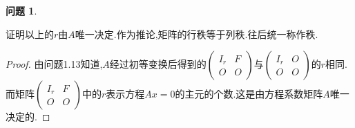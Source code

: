 \documentclass[11pt]{ctexart}
\theoremstyle{definition}
\newtheorem{qqq}{问题}[section]
\numberwithin{equation}{section}
\begin{document}
\begin{qqq}
    \begin{pinked}
        证明以上的$r$由$A$唯一决定.作为推论,矩阵的行秩等于列秩.往后统一称作秩.
    \end{pinked}  
\end{qqq}
\begin{proof}
    由问题1.13知道,$A$经过初等变换后得到的$\begin{pmatrix}
        I_r&F\\O&O
    \end{pmatrix}$与$\begin{pmatrix}
        I_r & O\\O & O
    \end{pmatrix}$的$r$相同.\newline
    而矩阵$\begin{pmatrix}
        I_r&F\\O&O
    \end{pmatrix}$中的$r$表示方程$Ax=0$的主元的个数.这是由方程系数矩阵$A$唯一决定的.
\end{proof}
\newpage
\end{document}
